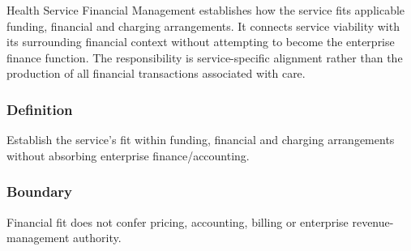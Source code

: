 Health Service Financial Management establishes how the service fits applicable funding, financial and charging arrangements. It connects service viability with its surrounding financial context without attempting to become the enterprise finance function. The responsibility is service-specific alignment rather than the production of all financial transactions associated with care.

\subsubsection*{Definition}

Establish the service’s fit within funding, financial and charging arrangements without absorbing enterprise finance/\allowbreak{}accounting.

\subsubsection*{Boundary}

Financial fit does not confer pricing, accounting, billing or enterprise revenue-management authority.

